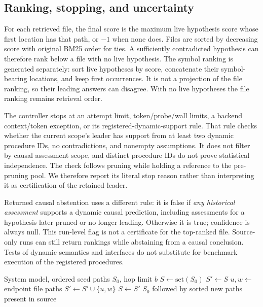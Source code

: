 \documentclass[letterpaper,journal]{IEEEtran}
\begin{document}
\subsection{Ranking, stopping, and uncertainty}\label{sec:output}
For each retrieved file, the final score is the maximum live hypothesis score whose first location has that path, or $-1$ when none does. Files are sorted by decreasing score with original BM25 order for ties. A sufficiently contradicted hypothesis can therefore rank below a file with no live hypothesis. The symbol ranking is generated separately: sort live hypotheses by score, concatenate their symbol-bearing locations, and keep first occurrences. It is not a projection of the file ranking, so their leading answers can disagree. With no live hypotheses the file ranking remains retrieval order.

The controller stops at an attempt limit, token/probe/wall limits, a backend context/token exception, or its registered-dynamic-support rule. That rule checks whether the current scope's leader has support from at least two dynamic procedure IDs, no contradictions, and nonempty assumptions. It does not filter by causal assessment scope, and distinct procedure IDs do not prove statistical independence. The check follows pruning while holding a reference to the pre-pruning pool. We therefore report its literal stop reason rather than interpreting it as certification of the retained leader.

Returned causal abstention uses a different rule: it is false if \emph{any historical assessment} supports a dynamic causal prediction, including assessments for a hypothesis later pruned or no longer leading. Otherwise it is true; confidence is always null. This run-level flag is not a certificate for the top-ranked file. Source-only runs can still return rankings while abstaining from a causal conclusion. Tests of dynamic semantics and interfaces do not substitute for benchmark execution of the registered procedures.

\begin{algorithm}[t]
\caption{Dependency neighborhood}\label{alg:neighborhood}
\begin{algorithmic}[1]\small
\Require System model, ordered seed paths $S_0$, hop limit $b$
\State $S\gets\mathrm{set}(S_0)$
  \State $S'\gets S$
    \State $u,w\gets$ endpoint file paths
     \State $S'\gets S'\cup\{u,w\}$ \EndIf
  \EndFor
  \State $S\gets S'$
\EndFor
\State \Return $S_0$ followed by sorted new paths present in source
\end{algorithmic}
\end{algorithm}
\end{document}
